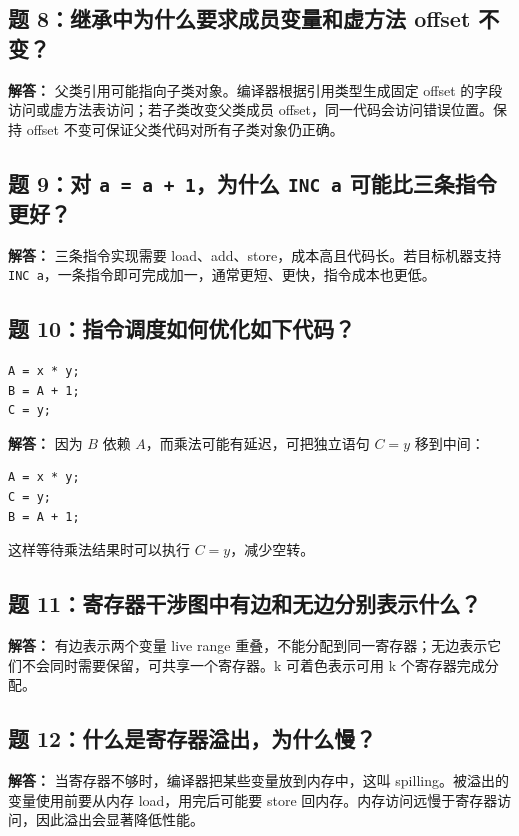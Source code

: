 \documentclass[UTF8,fontset=none,11pt]{ctexart}
\begin{document}
\subsection*{题 8：继承中为什么要求成员变量和虚方法 offset 不变？}

\textbf{解答：} 父类引用可能指向子类对象。编译器根据引用类型生成固定 offset 的字段访问或虚方法表访问；若子类改变父类成员 offset，同一代码会访问错误位置。保持 offset 不变可保证父类代码对所有子类对象仍正确。

\subsection*{题 9：对 \texttt{a = a + 1}，为什么 \texttt{INC a} 可能比三条指令更好？}

\textbf{解答：} 三条指令实现需要 load、add、store，成本高且代码长。若目标机器支持 \texttt{INC a}，一条指令即可完成加一，通常更短、更快，指令成本也更低。

\subsection*{题 10：指令调度如何优化如下代码？}

\begin{verbatim}
A = x * y;
B = A + 1;
C = y;
\end{verbatim}

\textbf{解答：} 因为 \(B\) 依赖 \(A\)，而乘法可能有延迟，可把独立语句 \(C=y\) 移到中间：

\begin{verbatim}
A = x * y;
C = y;
B = A + 1;
\end{verbatim}

这样等待乘法结果时可以执行 \(C=y\)，减少空转。

\subsection*{题 11：寄存器干涉图中有边和无边分别表示什么？}

\textbf{解答：} 有边表示两个变量 live range 重叠，不能分配到同一寄存器；无边表示它们不会同时需要保留，可共享一个寄存器。k 可着色表示可用 k 个寄存器完成分配。

\subsection*{题 12：什么是寄存器溢出，为什么慢？}

\textbf{解答：} 当寄存器不够时，编译器把某些变量放到内存中，这叫 spilling。被溢出的变量使用前要从内存 load，用完后可能要 store 回内存。内存访问远慢于寄存器访问，因此溢出会显著降低性能。
\end{document}
